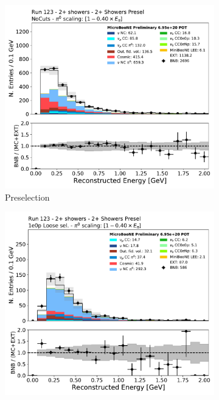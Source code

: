 \begin{figure}[H]
    \centering
    \begin{subfigure}{0.3\textwidth}
    \includegraphics[width=1.00\textwidth]{Sidebands/Figures/TwoShr_1e0pSel_newSamples/reco_e_presel.pdf}
    \caption{\zpsel Preselection}
    \end{subfigure}
    \begin{subfigure}{0.3\textwidth}
    \includegraphics[width=1.00\textwidth]{Sidebands/Figures/TwoShr_1e0pSel_newSamples/reco_e_loose.pdf}

\end{subfigure}
\end{figure}
